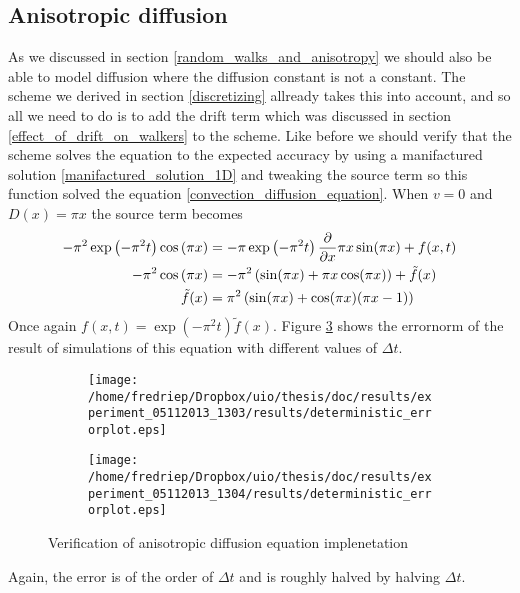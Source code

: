 \subsection{Anisotropic diffusion}

As we discussed in section \ref{random_walks_and_anisotropy} we should also be able to model diffusion where the diffusion constant is not a constant. 
The scheme we derived in section \ref{discretizing} allready takes this into account, and so all we need to do is to add the drift term which was discussed in section \ref{effect_of_drift_on_walkers} to the scheme. 
Like before we should verify that the scheme solves the equation to the expected accuracy by using a manifactured solution \ref{manifactured_solution_1D} and tweaking the source term so this function solved the equation \ref{convection_diffusion_equation}. 
When $v=0$ and $D(x) = \pi x$ the source term becomes
\begin{align*}
 -\pi^2\exp\left(-\pi^2t\right)\cos\left(\pi x\right) &= -\pi\exp\left(-\pi^2t\right)\frac{\partial}{\partial x}\pi x\sin(\pi x) +f(x,t) \\
 -\pi^2\cos\left(\pi x\right) &= -\pi^2\left(\sin(\pi x) + \pi x\cos(\pi x)\right) +\tilde{f}(x) \\
 \tilde{f}(x) &= \pi^2\left(\sin(\pi x) +\cos(\pi x)(\pi x-1)\right)
\end{align*}
Once again $f(x,t) = \exp\left(-\pi^2t\right)\tilde{f}(x)$. Figure \ref{anisotropic_diffusion_verification} shows the errornorm of the result of simulations of this equation with different values of $\Delta t$.

\begin{figure}[H]
\centering
\begin{subfigure}[b]{0.48\textwidth}
\texttt{[image: /home/fredriep/Dropbox/uio/thesis/doc/results/experiment\_05112013\_1303/results/deterministic\_errorplot.eps]}
\caption{}
\label{anisotropic_diffusion_verification:single_dt}
\end{subfigure}
\begin{subfigure}[b]{0.48\textwidth}
\texttt{[image: /home/fredriep/Dropbox/uio/thesis/doc/results/experiment\_05112013\_1304/results/deterministic\_errorplot.eps]}
\caption{}
\label{anisotropic_diffusion_verification:double_dt}
\end{subfigure}
\caption[Verification of anisotropic diffusion equation implenetation]{Verification of anisotropic diffusion equation implenetation}
\label{anisotropic_diffusion_verification}
\end{figure}
Again, the error is of the order of $\Delta t$ and is roughly halved by halving $\Delta t$.
